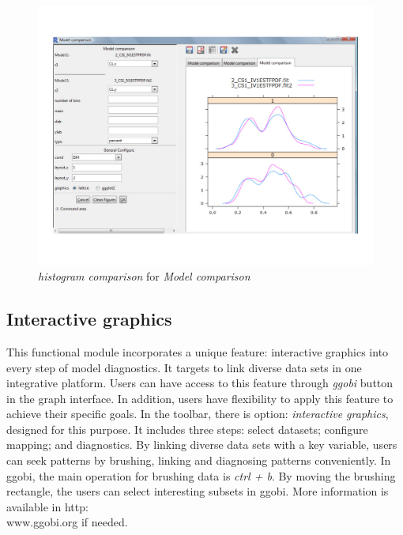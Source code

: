 \documentclass[a4paper]{article}
\begin{document}
\begin{figure}[h!tb] \centering
\includegraphics[scale=0.6]{modelcc2.pdf}
\caption{\textit{histogram comparison} for \textit{Model comparison}}
\label{modelcc2}
\end{figure}
\subsection{Interactive graphics}
This functional module incorporates a unique feature: interactive graphics into every step of model diagnostics. It targets to link diverse data sets in one integrative platform. Users can have access to this feature through \textit{ggobi} button in the graph interface. In addition, users have flexibility to apply this feature to achieve their specific goals. In the toolbar, there is option: \textit{interactive graphics}, designed for this purpose. It includes three steps: select datasets; configure mapping; and diagnostics. By linking diverse data sets with a key variable, users can seek patterns by brushing, linking and diagnosing patterns conveniently.
\newline
\newline
In ggobi, the main operation for brushing data is \textit{ctrl + b}. By moving the brushing rectangle, the users can select interesting subsets in ggobi. More information is available in http:\\www.ggobi.org if needed.
\end{document}

